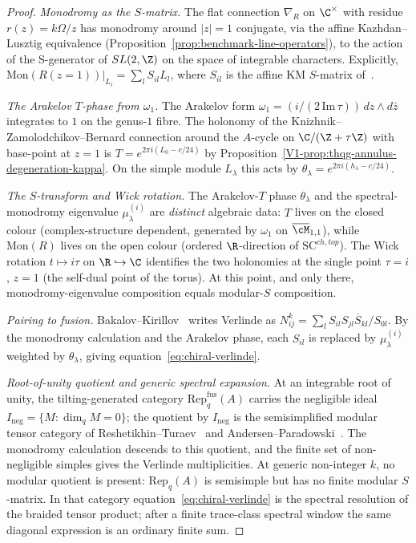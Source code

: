 \begin{proof}
\emph{Monodromy as the $S$-matrix.}
The flat connection $\nabla_R$ on $\C^\times$ with residue
$r(z) = k \Omega/z$ has monodromy around $|z|=1$ conjugate, via the
affine Kazhdan--Lusztig equivalence
(Proposition~\ref{prop:benchmark-line-operators}), to the action of
the S-generator of $SL(2,\Z)$ on the space of integrable
characters. Explicitly,
$\mathrm{Mon}(R(z=1))|_{L_i} = \sum_l S_{il} L_l$,
where $S_{il}$ is the affine KM $S$-matrix of~\cite{BK01,KL93}.

\emph{The Arakelov $T$-phase from $\omega_1$.}
The Arakelov form
$\omega_1 = (i/(2\,\mathrm{Im}\,\tau))\, dz \wedge d\bar z$
integrates to $1$ on the genus-$1$ fibre. The holonomy
of the Knizhnik--Zamolodchikov--Bernard connection around the
$A$-cycle on $\C/(\Z+\tau\Z)$ with base-point at
$z=1$ is $T = e^{2\pi i (L_0 - c/24)}$ by
Proposition~\textup{\ref*{V1-prop:thqg-annulus-degeneration-kappa}}.
On the simple module $L_\lambda$ this acts by $\theta_\lambda =
e^{2\pi i (h_\lambda - c/24)}$.

\emph{The $S$-transform and Wick rotation.}
The Arakelov-$T$ phase $\theta_\lambda$ and the
spectral-monodromy eigenvalue $\mu^{(i)}_\lambda$ are
\emph{distinct} algebraic data: $T$ lives on the closed colour
(complex-structure dependent, generated by $\omega_1$ on
$\overline{\cM}_{1,1}$), while $\mathrm{Mon}(R)$ lives on the
open colour (ordered $\R$-direction of
$\mathrm{SC}^{ch,top}$). The Wick rotation $t \mapsto i\tau$ on
$\R \hookrightarrow \C$ identifies the two holonomies at the
single point $\tau = i$, $z=1$ (the self-dual point of the
torus). At this point, and only there, monodromy-eigenvalue
composition equals modular-$S$ composition.

\emph{Pairing to fusion.}
Bakalov--Kirillov~\cite[Thm 3.1.16]{BK01} writes Verlinde as
$N^k_{ij} = \sum_l S_{il} S_{jl} \overline{S}_{kl}/S_{0l}$. By
the monodromy calculation and the Arakelov phase, each $S_{il}$
is replaced by $\mu^{(i)}_\lambda$ weighted by $\theta_\lambda$, giving
equation~\eqref{eq:chiral-verlinde}.

\emph{Root-of-unity quotient and generic spectral expansion.}
At an integrable root of unity, the tilting-generated category
$\mathrm{Rep}_q^{\mathrm{fus}}(A)$ carries the negligible
ideal $I_{\mathrm{neg}}=\{M:\dim_q M=0\}$; the quotient by
$I_{\mathrm{neg}}$ is the semisimplified modular tensor
category of Reshetikhin--Turaev~\cite[Ch.~XII]{Tur94} and
Andersen--Paradowski~\cite{And92,AP95}. The monodromy
calculation descends to this quotient, and the finite set of
non-negligible simples gives the Verlinde multiplicities.
At generic non-integer $k$, no modular quotient is present:
$\mathrm{Rep}_q(A)$ is semisimple but has no finite modular
$S$-matrix. In that category
equation~\eqref{eq:chiral-verlinde} is the spectral resolution
of the braided tensor product; after a finite trace-class
spectral window the same diagonal expression is an ordinary
finite sum.


\end{proof}
